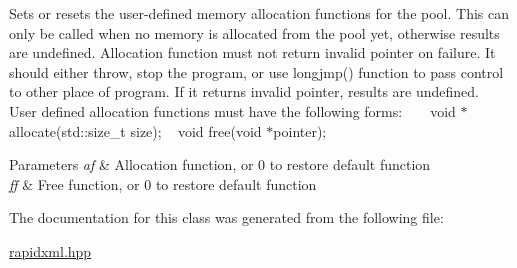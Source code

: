 Sets or resets the user-\/defined memory allocation functions for the pool. This can only be called when no memory is allocated from the pool yet, otherwise results are undefined. Allocation function must not return invalid pointer on failure. It should either throw, stop the program, or use {\ttfamily longjmp()} function to pass control to other place of program. If it returns invalid pointer, results are undefined. ~\newline
~\newline
 User defined allocation functions must have the following forms\+: ~\newline
{\ttfamily  ~\newline
void $\ast$allocate(std\+::size\+\_\+t size); ~\newline
void free(void $\ast$pointer); }~\newline
 
\begin{DoxyParams}{Parameters}
{\em af} & Allocation function, or 0 to restore default function \\
\hline
{\em ff} & Free function, or 0 to restore default function \\
\hline
\end{DoxyParams}


The documentation for this class was generated from the following file\+:\begin{DoxyCompactItemize}
\item 
\mbox{\hyperlink{rapidxml_8hpp}{rapidxml.\+hpp}}\end{DoxyCompactItemize}
